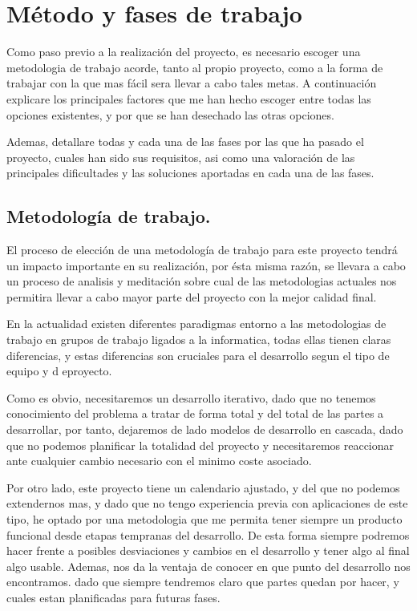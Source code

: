 \chapter{Método y fases de trabajo}

Como paso previo a la realización del proyecto, es necesario escoger una
metodologia de trabajo acorde, tanto al propio proyecto, como a la forma de
trabajar con la que mas fácil sera llevar a cabo tales metas. A continuación
explicare los principales factores que me han hecho escoger entre todas las
opciones existentes, y por que se han desechado las otras opciones.

Ademas, detallare todas y cada una de las fases por las que ha
pasado el proyecto, cuales han sido sus requisitos, asi como una valoración de
las principales dificultades y las soluciones aportadas en cada una de las fases.

\section{Metodología de trabajo.}
El proceso de elección de una metodología de trabajo para este proyecto tendrá
un impacto importante en su realización, por ésta misma razón, se llevara a cabo un proceso
de analisis y meditación sobre cual de las metodologias actuales nos permitira
llevar a cabo mayor parte del proyecto con la mejor calidad final.

En la actualidad existen diferentes paradigmas entorno a las metodologias de
trabajo en grupos de trabajo ligados a la informatica, todas ellas tienen claras
diferencias, y estas diferencias son cruciales para el desarrollo segun el tipo
de equipo y d eproyecto.

Como es obvio, necesitaremos un desarrollo iterativo, dado que no tenemos
conocimiento del problema a tratar de forma total y del total de las partes a
desarrollar, por tanto, dejaremos de lado modelos de desarrollo en cascada, dado
que no podemos planificar la totalidad del proyecto y necesitaremos reaccionar
ante cualquier cambio necesario con el minimo coste asociado.

Por otro lado, este proyecto tiene un calendario ajustado, y del que no podemos
extendernos mas, y dado que no tengo experiencia previa con aplicaciones de este
tipo, he optado por una metodologia que me permita tener siempre un producto
funcional desde etapas tempranas del desarrollo. De esta forma siempre podremos
hacer frente a posibles desviaciones y cambios en el desarrollo y tener algo al
final algo usable. Ademas, nos da la ventaja de conocer en que punto del
desarrollo nos encontramos. dado que siempre tendremos claro que partes quedan
por hacer, y cuales estan planificadas para futuras fases.

